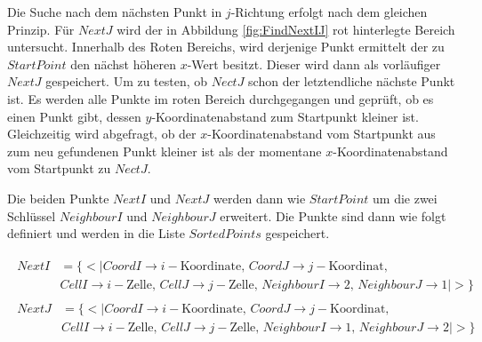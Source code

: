 
Die Suche nach dem nächsten Punkt in $j$-Richtung erfolgt nach dem gleichen Prinzip. Für $NextJ$ wird der in Abbildung \ref{fig:FindNextIJ} rot hinterlegte Bereich untersucht. Innerhalb des Roten Bereichs, wird derjenige Punkt ermittelt der zu $StartPoint$ den nächst höheren $x$-Wert besitzt. Dieser wird dann als vorläufiger $NextJ$ gespeichert. Um zu testen, ob $NectJ$ schon der letztendliche nächste Punkt ist. Es werden alle Punkte im roten Bereich durchgegangen und geprüft, ob es einen Punkt gibt, dessen $y$-Koordinatenabstand zum Startpunkt kleiner ist. Gleichzeitig wird abgefragt, ob der $x$-Koordinatenabstand vom Startpunkt aus zum neu gefundenen Punkt kleiner ist als der momentane $x$-Koordinatenabstand vom Startpunkt zu $NectJ$.

%

Die beiden Punkte $NextI$ und $NextJ$ werden dann wie $StartPoint$ um die zwei Schlüssel $NeighbourI$ und $NeighbourJ$ erweitert. Die Punkte sind dann wie folgt definiert und werden in die Liste $SortedPoints$ gespeichert. 


\begin{gather*}
	\begin{split}
		NextI &= \{ <|CoordI \rightarrow i-\text{Koordinate},\, CoordJ \rightarrow j-\text{Koordinat},\, \\
		&CellI \rightarrow i-\text{Zelle},\, CellJ \rightarrow j-\text{Zelle},\,
		NeighbourI \rightarrow 2, \,NeighbourJ \rightarrow 1  |>\}
	\end{split}\\
	\begin{split}
	NextJ &= \{ <|CoordI \rightarrow i-\text{Koordinate},\, CoordJ \rightarrow j-\text{Koordinat},\, \\
	&CellI \rightarrow i-\text{Zelle},\, CellJ \rightarrow j-\text{Zelle},\,
	NeighbourI \rightarrow 1, \,NeighbourJ \rightarrow 2 |>\}
\end{split}
\end{gather*}




